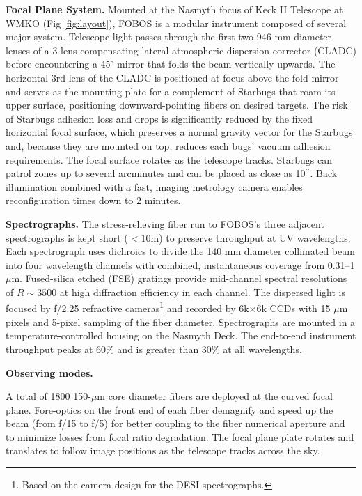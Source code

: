 \documentclass[oneside,11pt]{amsart}
\newcommand{\arcsec}{\mbox{$^{\prime\prime}$}}
\begin{document}
\noindent \textbf{Focal Plane System.} Mounted at the Nasmyth focus of Keck II Telescope at WMKO (Fig \ref{fig:layout}), FOBOS is a modular instrument
composed of several major system.  Telescope light passes through the first two 946 mm diameter lenses of a 3-lens
compensating lateral atmospheric dispersion corrector (CLADC) before encountering a 45$^\circ$ mirror that folds the
beam vertically upwards.  The horizontal 3rd lens of the CLADC is positioned at focus above the fold mirror and serves
as the mounting plate for a complement of Starbugs that roam its upper surface, positioning downward-pointing fibers on
desired targets.  The risk of Starbugs adhesion loss and drops is significantly reduced by the fixed horizontal focal
surface, which preserves a normal gravity vector for the Starbugs and, because they are mounted on top, reduces each
bugs' vacuum adhesion requirements.  The focal surface rotates as the telescope tracks.  Starbugs can patrol zones up to several arcminutes and can be placed as close as 10\arcsec{}.  Back illumination combined with a fast, imaging metrology camera enables reconfiguration times down to 2 minutes. 

\noindent \textbf{Spectrographs.} The stress-relieving fiber run to FOBOS's three adjacent spectrographs is kept short ($< 10$m) to
preserve throughput at UV wavelengths.  Each spectrograph uses dichroics to divide the 140 mm diameter collimated beam
into four wavelength channels with combined, instantaneous coverage from 0.31--1 $\mu$m.  Fused-silica etched (FSE)
gratings provide mid-channel spectral resolutions of $R \sim 3500$ at high diffraction efficiency in each channel.  The
dispersed light is focused by f/2.25 refractive cameras\footnote{Based on the camera design for the DESI
spectrographs.} and recorded by 6k$\times$6k CCDs with 15 $\mu$m pixels and 5-pixel sampling of the fiber diameter.
Spectrographs are mounted in a temperature-controlled housing on the Nasmyth Deck.  The end-to-end instrument
throughput peaks at 60\% and is greater than 30\% at all wavelengths.


\noindent \textbf{Observing modes.}


A total of 1800 150-$\mu$m core diameter fibers are deployed at the curved focal plane.  Fore-optics on the front end
of each fiber demagnify and speed up the beam (from f/15 to f/5) for better coupling to the fiber numerical aperture
and to minimize losses from focal ratio degradation.  The focal plane plate rotates and translates to follow image
positions as the telescope tracks across the sky.  
\end{document}
